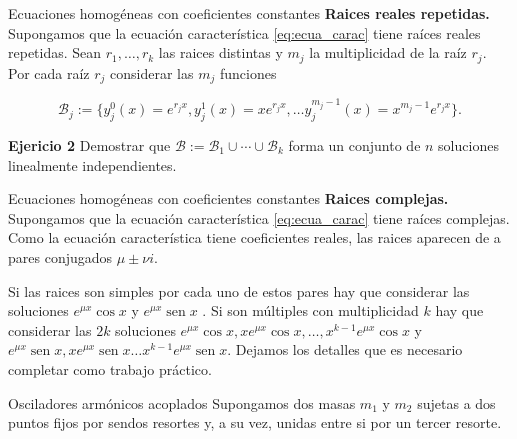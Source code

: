 \documentclass[hyperref={colorlinks=true}]{beamer}
\DeclareMathOperator{\sen}{sen}
\begin{document}
\begin{frame}{Ecuaciones homogéneas con coeficientes constantes}
\textbf{Raices reales repetidas.}
Supongamos que la ecuación característica \eqref{eq:ecua_carac} tiene  raíces reales repetidas. Sean $r_1,\ldots,r_k$ las raices distintas y $m_j$ la multiplicidad de la raíz $r_j$. Por cada raíz $r_j$ considerar las $m_j$  funciones

\[\mathcal{B}_j:=\{y_j^0(x)=e^{r_jx}, y_j^1(x)=xe^{r_jx},\ldots y_j^{m_j-1}(x)=x^{m_j-1}e^{r_jx}\}.\]

 \textbf{Ejericio 2} Demostrar que $\mathcal{B}:=\mathcal{B}_1\cup\cdots\cup \mathcal{B}_k$ forma
 un conjunto de  $n$  soluciones linealmente independientes. 

\end{frame}

\begin{frame}{Ecuaciones homogéneas con coeficientes constantes}
\textbf{Raices complejas.}
Supongamos que la ecuación característica \eqref{eq:ecua_carac} tiene  raíces complejas. Como la ecuación característica tiene coeficientes reales, las raices aparecen de a pares conjugados $\mu\pm\nu i$. 

Si las raices son simples por cada uno de estos pares hay que considerar las soluciones $ e^{\mu x}\cos x$ y $e^{\mu x}\sen x$ . Si son múltiples con multiplicidad $k$ hay que considerar las $2k$ soluciones   $ e^{\mu x}\cos x, xe^{\mu x}\cos x,\ldots, x^{k-1}e^{\mu x}\cos x$ y $e^{\mu x}\sen x,xe^{\mu x}\sen x\ldots x^{k-1}e^{\mu x}\sen x $. Dejamos los detalles que es necesario completar como trabajo práctico.
 
\end{frame}


\begin{frame}{Osciladores armónicos acoplados}
Supongamos dos masas $m_1$ y $m_2$ sujetas a dos puntos fijos por sendos resortes y, a su vez, unidas entre si por un tercer resorte.  
\begin{center}
 \end{center}
\end{frame}
\end{document}
